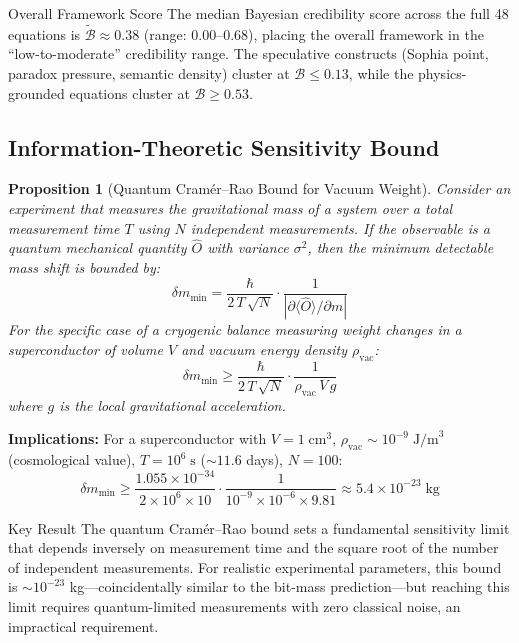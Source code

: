 \documentclass[11pt,a4paper]{article}
\newtheorem{proposition}{Proposition}
\begin{document}
\begin{warnbox}{Overall Framework Score}
The median Bayesian credibility score across the full 48 equations is $\tilde{\mathcal{B}} \approx 0.38$ (range: 0.00--0.68), placing the overall framework in the ``low-to-moderate'' credibility range. The speculative constructs (Sophia point, paradox pressure, semantic density) cluster at $\mathcal{B} \leq 0.13$, while the physics-grounded equations cluster at $\mathcal{B} \geq 0.53$.
\end{warnbox}

\subsection{Information-Theoretic Sensitivity Bound}

\begin{proposition}[Quantum Cram\'er--Rao Bound for Vacuum Weight]
Consider an experiment that measures the gravitational mass of a system over a total measurement time $T$ using $N$ independent measurements. If the observable is a quantum mechanical quantity $\hat{O}$ with variance $\sigma^2$, then the minimum detectable mass shift is bounded by:
\begin{equation}
  \delta m_{\min} = \frac{\hbar}{2\,T\,\sqrt{N}} \cdot \frac{1}{|\partial \langle \hat{O} \rangle / \partial m|}
  \label{eq:cr_bound}
\end{equation}
For the specific case of a cryogenic balance measuring weight changes in a superconductor of volume $V$ and vacuum energy density $\rho_{\text{vac}}$:
\begin{equation}
  \delta m_{\min} \geq \frac{\hbar}{2\,T\,\sqrt{N}} \cdot \frac{1}{\rho_{\text{vac}}\, V\, g}
  \label{eq:vacuum_cr_bound}
\end{equation}
where $g$ is the local gravitational acceleration.
\end{proposition}

\textbf{Implications:} For a superconductor with $V = 1\;\text{cm}^3$, $\rho_{\text{vac}} \sim 10^{-9}\;\text{J/m}^3$ (cosmological value), $T = 10^6\;\text{s}$ ($\sim 11.6$ days), $N = 100$:
\begin{equation}
  \delta m_{\min} \geq \frac{1.055 \times 10^{-34}}{2 \times 10^6 \times 10} \cdot \frac{1}{10^{-9} \times 10^{-6} \times 9.81}
  \approx 5.4 \times 10^{-23}\;\text{kg}
\end{equation}

\begin{infobox}{Key Result}
The quantum Cram\'er--Rao bound sets a fundamental sensitivity limit that depends inversely on measurement time and the square root of the number of independent measurements. For realistic experimental parameters, this bound is $\sim 10^{-23}$ kg---coincidentally similar to the bit-mass prediction---but reaching this limit requires quantum-limited measurements with zero classical noise, an impractical requirement.
\end{infobox}
\end{document}
